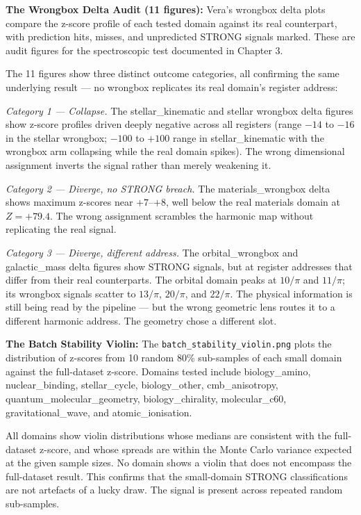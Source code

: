 \documentclass[11pt, letterpaper, openany]{book}
\begin{document}
\begin{empiricalbox}
\textbf{The Wrongbox Delta Audit (11 figures):}
Vera's wrongbox delta plots compare the z-score profile of each tested
domain against its real counterpart, with prediction hits, misses, and
unpredicted STRONG signals marked. These are audit figures for the
spectroscopic test documented in Chapter 3.

The 11 figures show three distinct outcome categories, all confirming
the same underlying result --- no wrongbox replicates its real domain's
register address:

\textit{Category 1 --- Collapse.} The stellar\_kinematic and stellar
wrongbox delta figures show z-score profiles driven deeply negative
across all registers (range $-14$ to $-16$ in the stellar wrongbox;
$-100$ to $+100$ range in stellar\_kinematic with the wrongbox arm
collapsing while the real domain spikes). The wrong dimensional
assignment inverts the signal rather than merely weakening it.

\textit{Category 2 --- Diverge, no STRONG breach.} The materials\_wrongbox
delta shows maximum z-scores near $+7$--$+8$, well below the real
materials domain at $Z = +79.4$. The wrong assignment scrambles the
harmonic map without replicating the real signal.

\textit{Category 3 --- Diverge, different address.} The orbital\_wrongbox
and galactic\_mass delta figures show STRONG signals, but at register
addresses that differ from their real counterparts. The orbital domain
peaks at $10/\pi$ and $11/\pi$; its wrongbox signals scatter to
$13/\pi$, $20/\pi$, and $22/\pi$. The physical information is still
being read by the pipeline --- but the wrong geometric lens routes it
to a different harmonic address. The geometry chose a different slot.

\textbf{The Batch Stability Violin:}
The \texttt{batch\_stability\_violin.png} plots the distribution of z-scores
from 10 random 80\% sub-samples of each small domain against the full-dataset
z-score. Domains tested include biology\_amino, nuclear\_binding, stellar\_cycle,
biology\_other, cmb\_anisotropy, quantum\_molecular\_geometry, biology\_chirality,
molecular\_c60, gravitational\_wave, and atomic\_ionisation.

All domains show violin distributions whose medians are consistent with the
full-dataset z-score, and whose spreads are within the Monte Carlo variance
expected at the given sample sizes. No domain shows a violin that does not
encompass the full-dataset result. This confirms that the small-domain STRONG
classifications are not artefacts of a lucky draw. The signal is present
across repeated random sub-samples.


\end{empiricalbox}
\end{document}
